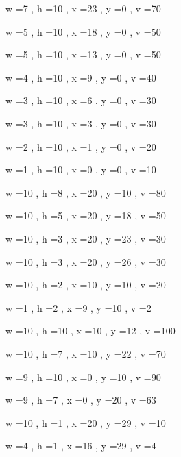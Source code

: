 \documentclass[11pt]{article}
\begin{document}
w =7 , h =10 , x =23 , y =0 , v =70
\par
w =5 , h =10 , x =18 , y =0 , v =50
\par
w =5 , h =10 , x =13 , y =0 , v =50
\par
w =4 , h =10 , x =9 , y =0 , v =40
\par
w =3 , h =10 , x =6 , y =0 , v =30
\par
w =3 , h =10 , x =3 , y =0 , v =30
\par
w =2 , h =10 , x =1 , y =0 , v =20
\par
w =1 , h =10 , x =0 , y =0 , v =10
\par
w =10 , h =8 , x =20 , y =10 , v =80
\par
w =10 , h =5 , x =20 , y =18 , v =50
\par
w =10 , h =3 , x =20 , y =23 , v =30
\par
w =10 , h =3 , x =20 , y =26 , v =30
\par
w =10 , h =2 , x =10 , y =10 , v =20
\par
w =1 , h =2 , x =9 , y =10 , v =2
\par
w =10 , h =10 , x =10 , y =12 , v =100
\par
w =10 , h =7 , x =10 , y =22 , v =70
\par
w =9 , h =10 , x =0 , y =10 , v =90
\par
w =9 , h =7 , x =0 , y =20 , v =63
\par
w =10 , h =1 , x =20 , y =29 , v =10
\par
w =4 , h =1 , x =16 , y =29 , v =4
\par
\newpage


\end{document}
